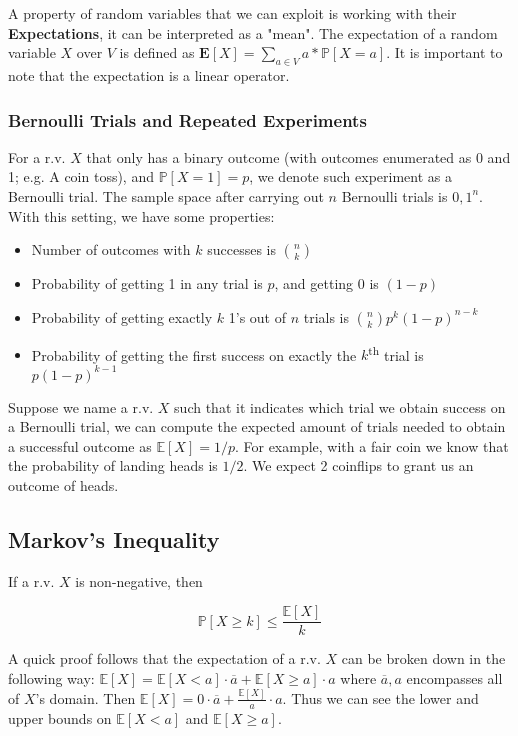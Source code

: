 \documentclass{article}
\begin{document}
\begin{multicols}{2}
A property of random variables that we can exploit is working with their \textbf{Expectations}, it can be interpreted as a "mean". The expectation of a random variable $X$ over $V$ is defined as $\mathbf{E}[X] = \sum_{a \in V} a * \mathbb{P}[X=a]$. It is important to note that the expectation is a linear operator.

\subsubsection{Bernoulli Trials and Repeated Experiments}

For a r.v. $X$ that only has a binary outcome (with outcomes enumerated as 0 and 1; e.g. A coin toss), and $\mathbb{P}[X=1] = p$, we denote such experiment as a Bernoulli trial. The sample space after carrying out $n$ Bernoulli trials is ${0,1}^n$. With this setting, we have some properties:

\begin{itemize}
    \item Number of outcomes with $k$ successes is $n \choose k$
    \item Probability of getting 1 in any trial is $p$, and getting 0 is $(1 - p)$
    \item Probability of getting exactly $k$ 1's out of $n$ trials is ${n \choose k} p^k (1 - p)^{n - k}$
    \item Probability of getting the first success on exactly the $k$\textsuperscript{th} trial is $p(1-p)^{k-1}$
\end{itemize}

Suppose we name a r.v. $X$ such that it indicates which trial we obtain success on a Bernoulli trial, we can compute the expected amount of trials needed to obtain a successful outcome as $\mathbb{E}[X] = 1/p$. For example, with a fair coin we know that the probability of landing heads is $1/2$. We expect 2 coinflips to grant us an outcome of heads.

\subsection{Markov's Inequality}

If a r.v. $X$ is non-negative, then 

$$
\mathbb{P}[X \geq k] \leq \frac{\mathbb{E}[X]}{k}
$$

A quick proof follows that the expectation of a r.v. $X$ can be broken down in the following way: $\mathbb{E}[X] = \mathbb{E}[X < a] \cdot \overline{a} + \mathbb{E}[X \geq a] \cdot a$ where $\overline{a}, a$ encompasses all of $X$'s domain. Then $\mathbb{E}[X] = 0 \cdot \overline{a} + \frac{\mathbb{E}[X]}{a} \cdot a$. Thus we can see the lower and upper bounds on $\mathbb{E}[X < a]$ and $\mathbb{E}[X \geq a]$.


\end{multicols}
\end{document}
